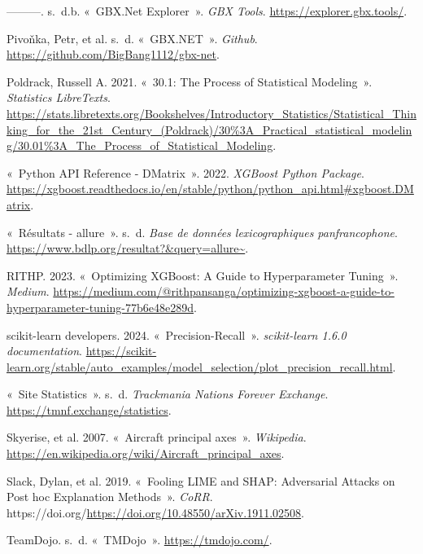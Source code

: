 \documentclass[
  oneside,
  open=any]{scrreprt}
\newlength{\cslhangindent}
\newenvironment{CSLReferences}[2] %
 {\begin{list}{}{%
  \setlength{\itemindent}{0pt}
  \setlength{\leftmargin}{0pt}
  \setlength{\parsep}{0pt}
  \ifodd #1
   \setlength{\leftmargin}{\cslhangindent}
   \setlength{\itemindent}{-1\cslhangindent}
  \fi
  \setlength{\itemsep}{#2\baselineskip}}}
 {\end{list}}
\begin{document}
\begin{CSLReferences}{1}{0}
---------. s.~d.b. {«~GBX.Net Explorer~»}. \emph{GBX Tools}.
\url{https://explorer.gbx.tools/}.

Pivoňka, Petr, et al. s.~d. {«~GBX.NET~»}. \emph{Github}.
\url{https://github.com/BigBang1112/gbx-net}.

Poldrack, Russell A. 2021. {«~30.1: The Process of Statistical
Modeling~»}. \emph{Statistics LibreTexts}.
\url{https://stats.libretexts.org/Bookshelves/Introductory_Statistics/Statistical_Thinking_for_the_21st_Century_(Poldrack)/30\%3A_Practical_statistical_modeling/30.01\%3A_The_Process_of_Statistical_Modeling}.

{«~Python API Reference - DMatrix~»}. 2022. \emph{XGBoost Python
Package}.
\url{https://xgboost.readthedocs.io/en/stable/python/python_api.html\#xgboost.DMatrix}.

{«~Résultats - allure~»}. s.~d. \emph{Base de données lexicographiques
panfrancophone}. \url{https://www.bdlp.org/resultat?&query=allure~}.

RITHP. 2023. {«~Optimizing XGBoost: A Guide to Hyperparameter Tuning~»}.
\emph{Medium}.
\url{https://medium.com/@rithpansanga/optimizing-xgboost-a-guide-to-hyperparameter-tuning-77b6e48e289d}.

scikit-learn developers. 2024. {«~Precision-Recall~»}.
\emph{scikit-learn 1.6.0 documentation}.
\url{https://scikit-learn.org/stable/auto_examples/model_selection/plot_precision_recall.html}.

{«~Site Statistics~»}. s.~d. \emph{Trackmania Nations Forever Exchange}.
\url{https://tmnf.exchange/statistics}.

Skyerise, et al. 2007. {«~Aircraft principal axes~»}. \emph{Wikipedia}.
\url{https://en.wikipedia.org/wiki/Aircraft_principal_axes}.

Slack, Dylan, et al. 2019. {«~Fooling LIME and SHAP: Adversarial Attacks
on Post hoc Explanation Methods~»}. \emph{CoRR}.
https://doi.org/\url{https://doi.org/10.48550/arXiv.1911.02508}.

TeamDojo. s.~d. {«~TMDojo~»}. \url{https://tmdojo.com/}.


\end{CSLReferences}
\end{document}
